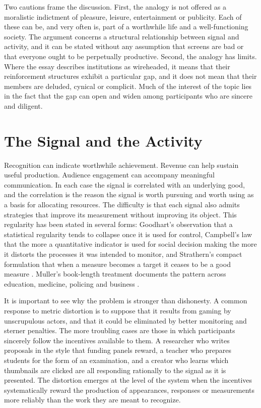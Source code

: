 \documentclass[11pt]{article}
\theoremstyle{definition}
\theoremstyle{remark}
\begin{document}
Two cautions frame the discussion. First, the analogy is not offered as a moralistic indictment of pleasure, leisure, entertainment or publicity. Each of these can be, and very often is, part of a worthwhile life and a well-functioning society. The argument concerns a structural relationship between signal and activity, and it can be stated without any assumption that screens are bad or that everyone ought to be perpetually productive. Second, the analogy has limits. Where the essay describes institutions as wireheaded, it means that their reinforcement structures exhibit a particular gap, and it does not mean that their members are deluded, cynical or complicit. Much of the interest of the topic lies in the fact that the gap can open and widen among participants who are sincere and diligent.

\section{The Signal and the Activity}

Recognition can indicate worthwhile achievement. Revenue can help sustain useful production. Audience engagement can accompany meaningful communication. In each case the signal is correlated with an underlying good, and the correlation is the reason the signal is worth pursuing and worth using as a basis for allocating resources. The difficulty is that each signal also admits strategies that improve its measurement without improving its object. This regularity has been stated in several forms: Goodhart's observation that a statistical regularity tends to collapse once it is used for control, Campbell's law that the more a quantitative indicator is used for social decision making the more it distorts the processes it was intended to monitor, and Strathern's compact formulation that when a measure becomes a target it ceases to be a good measure \cite{goodhart1975,campbell1979,strathern1997}. Muller's book-length treatment documents the pattern across education, medicine, policing and business \cite{muller2018}.

It is important to see why the problem is stronger than dishonesty. A common response to metric distortion is to suppose that it results from gaming by unscrupulous actors, and that it could be eliminated by better monitoring and sterner penalties. The more troubling cases are those in which participants sincerely follow the incentives available to them. A researcher who writes proposals in the style that funding panels reward, a teacher who prepares students for the form of an examination, and a creator who learns which thumbnails are clicked are all responding rationally to the signal as it is presented. The distortion emerges at the level of the system when the incentives systematically reward the production of appearances, responses or measurements more reliably than the work they are meant to recognize.
\end{document}
